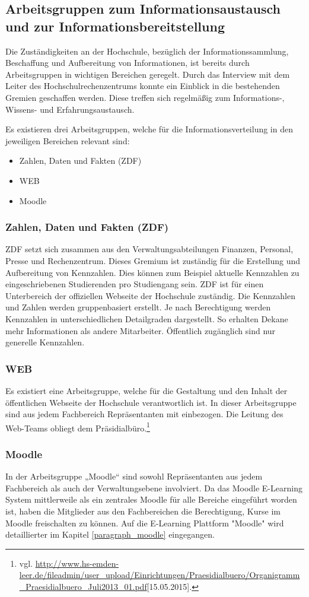 \subsection{Arbeitsgruppen zum Informationsaustausch und zur Informationsbereitstellung}
\label{subsection_arbeitsgruppen_informationsaustausch}
Die Zuständigkeiten an der Hochschule, bezüglich der Informationssammlung, Beschaffung und Aufbereitung von Informationen, ist bereits durch Arbeitsgruppen in wichtigen Bereichen geregelt. Durch das Interview mit dem Leiter des Hochschulrechenzentrums konnte ein Einblick in die bestehenden Gremien geschaffen werden. Diese treffen sich regelmäßig zum Informations-, Wissens- und Erfahrungsaustausch.

Es existieren drei Arbeitsgruppen, welche für die Informationsverteilung in den jeweiligen Bereichen relevant sind:

\begin{itemize}
	\item Zahlen, Daten und Fakten (ZDF)
	\item WEB
	\item Moodle
\end{itemize}

\subsubsection{Zahlen, Daten und Fakten (ZDF)}
ZDF setzt sich zusammen aus den Verwaltungsabteilungen Finanzen, Personal, Presse und Rechenzentrum. Dieses Gremium ist zuständig für die Erstellung und Aufbereitung von Kennzahlen. Dies können zum Beispiel aktuelle Kennzahlen zu eingeschriebenen Studierenden pro Studiengang sein.  ZDF ist für einen Unterbereich der offiziellen Webseite der Hochschule zuständig. Die Kennzahlen und Zahlen werden gruppenbasiert erstellt. Je nach Berechtigung werden Kennzahlen in unterschiedlichen Detailgraden dargestellt. So erhalten Dekane mehr Informationen als andere Mitarbeiter. Öffentlich zugänglich sind nur generelle Kennzahlen. 

\subsubsection{WEB}
Es existiert eine Arbeitsgruppe, welche für die Gestaltung und den Inhalt der öffentlichen Webseite der Hochschule verantwortlich ist. In dieser Arbeitsgruppe sind aus jedem Fachbereich Repräsentanten mit einbezogen. Die Leitung des Web-Teams obliegt dem Präsidialbüro.\footnote{vgl. \url{http://www.hs-emden-leer.de/fileadmin/user_upload/Einrichtungen/Praesidialbuero/Organigramm_Praesidialbuero_Juli2013_01.pdf}[15.05.2015].}

\subsubsection{Moodle}
In der Arbeitsgruppe „Moodle“ sind sowohl Repräsentanten aus jedem Fachbereich als auch der Verwaltungsebene involviert. Da das Moodle E-Learning System mittlerweile als ein zentrales Moodle für alle Bereiche eingeführt worden ist, haben die Mitglieder aus den Fachbereichen die Berechtigung, Kurse im Moodle freischalten zu können. Auf die E-Learning Plattform "Moodle" wird detaillierter im Kapitel \ref{paragraph_moodle} eingegangen.
